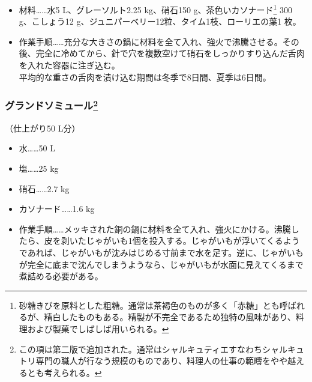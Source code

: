 \begin{recette}


\begin{itemize}
\item
  材料\ldots{}\ldots{}水5 L、グレーソルト2.25 kg、硝石150
  g、茶色いカソナード\footnote{砂糖きびを原料とした粗糖。通常は茶褐色のものが多く「赤糖」とも呼ばれるが、精白したものもある。精製が不完全であるため独特の風味があり、料理および製菓でしばしば用いられる。}
  300 g、こしょう12 g、ジュニパーベリー12粒、タイム1枝、ローリエの葉1
  枚。
\item
  作業手順\ldots{}\ldots{}充分な大きさの鍋に材料を全て入れ、強火で沸騰させる。その後、完全に冷めてから、針で穴を複数空けて硝石をしっかりすり込んだ舌肉を入れた容器に注ぎ込む。\\
  平均的な重さの舌肉を漬け込む期間は冬季で8日間、夏季は6日間。
\end{itemize}

\hypertarget{grande-saumure}{%
\subsubsection[グランドソミュール]{\texorpdfstring{グランドソミュール\footnote{この項は第二版で追加された。通常はシャルキュティエすなわちシャルキュトリ専門の職人が行なう規模のものであり、料理人の仕事の範疇をやや越えるとも考えられる。}}{グランドソミュール}}\label{grande-saumure}}



（仕上がり50 L分）

\begin{itemize}
\tightlist
\item
  水\ldots{}\ldots{}50 L
\item
  塩\ldots{}\ldots{}25 kg
\item
  硝石\ldots{}\ldots{}2.7 kg
\item
  カソナード\ldots{}\ldots{}1.6 kg
\item
  作業手順\ldots{}\ldots{}メッキされた銅の鍋に材料を全て入れ、強火にかける。沸騰したら、皮を剥いたじゃがいも1個を投入する。じゃがいもが浮いてくるようであれば、じゃがいもが沈みはじめる寸前まで水を足す。逆に、じゃがいもが完全に底まで沈んでしまうようなら、じゃがいもが水面に見えてくるまで煮詰める必要がある。
\end{itemize}


\end{recette}
